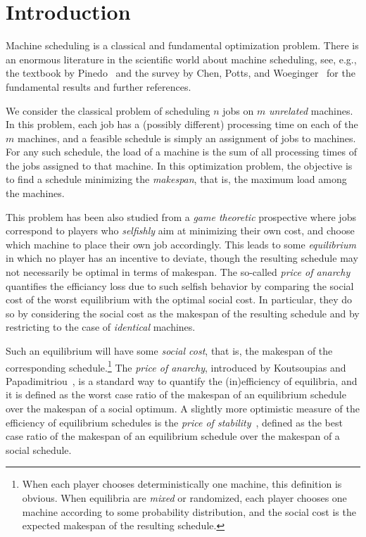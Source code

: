 \documentclass[runningheads]{llncs}
\begin{document}
%
\section{Introduction}\label{sec:intro}

Machine scheduling is a classical and fundamental optimization problem. There is an enormous literature in the scientific world about machine scheduling, see, e.g., the textbook by Pinedo~\cite{Pinedo/2012} and the survey by Chen, Potts, and Woeginger~\cite{Chen+Potts+Woeginger/1999} for the fundamental results and further references.

We consider the classical problem of scheduling $n$ jobs on $m$ \emph{unrelated} machines. In this problem, each job has a (possibly different) processing time on each of the $m$ machines, and a feasible schedule is simply an assignment of jobs to machines. For any such schedule, the load of a machine is the sum of all processing times of the jobs assigned to that machine. In this optimization problem, the objective is to find a schedule minimizing the
\emph{makespan}, that is, the maximum load among the machines. 

This problem has been also studied from a \emph{game theoretic} prospective where jobs correspond to players who \emph{selfishly} aim at minimizing their own cost, and choose which machine to place their own job accordingly. This leads to some \emph{equilibrium} in which no player has an incentive to deviate, though the resulting schedule may not necessarily be optimal  in terms of makespan. The so-called \emph{price of anarchy} \cite{PoAoriginal} quantifies the efficiancy loss due to such selfish behavior by comparing the social cost of the worst equilibrium with the optimal social cost. In particular, they do so by considering the social cost as the makespan of the resulting schedule and by restricting to the case of \emph{identical} machines.

Such an equilibrium will have some \emph{social cost}, that is, the makespan of the corresponding schedule.\footnote{When each player chooses deterministically one machine, this definition is obvious. When equilibria are \emph{mixed} or randomized, each player chooses one machine according to some probability distribution, and the social cost is the expected makespan of the resulting schedule.} The \emph{price of anarchy}, introduced by Koutsoupias and Papadimitriou~\cite{PoAoriginal}, is a standard way to quantify the (in)efficiency of equilibria, and it is defined as the worst case ratio of the makespan of an equilibrium schedule over the makespan of a social optimum. 
%
A slightly more optimistic measure of the efficiency of equilibrium schedules is the \emph{price of stability}~\cite{PoSoriginal}, defined as the best case ratio of the makespan of an equilibrium schedule over the makespan of a social schedule.
\end{document}
